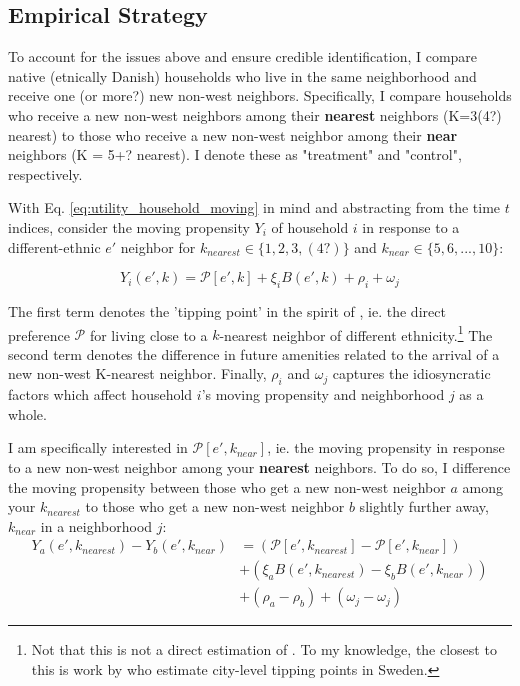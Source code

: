 \documentclass[../main.tex]{subfiles}
\begin{document}
\subsection{Empirical Strategy}
To account for the issues above and ensure credible identification, I compare native (etnically Danish) households who live in the same neighborhood and receive one (or more?) new non-west neighbors. Specifically, I compare households who receive a new non-west neighbors among their \textbf{nearest} neighbors (K=3(4?) nearest) to those who receive a new non-west neighbor among their \textbf{near} neighbors (K = 5+? nearest). I denote these as "treatment" and "control", respectively.

With Eq. \ref{eq:utility_household_moving} in mind and abstracting from the time $t$ indices, consider the moving propensity $Y_i$ of household $i$ in response to a different-ethnic $e'$ neighbor for $k_{nearest} \in \{1, 2, 3, (4?)\}$ and $k_{near} \in \{5, 6, ..., 10\}$:

\begin{equation}
    Y_i(e', k) = \mathcal{P}[e', k] + \xi_i B(e', k) + \rho_i + \omega_j
\end{equation}

The first term denotes the 'tipping point' in the spirit of \textcite{schelling1971dynamic}, ie. the direct preference $\mathcal{P}$ for living close to a $k$-nearest neighbor of different ethnicity.\footnote{Not that this is not a direct estimation of \textcite{schelling1971dynamic}. To my knowledge, the closest to this is work by \textcite{bohlmark_willen_2020_tipping} who estimate city-level tipping points in Sweden.}   The second term denotes the difference in future amenities related  to the arrival of a new non-west K-nearest neighbor. Finally, $\rho_i$ and $\omega_j$ captures the idiosyncratic factors which affect household $i$'s moving propensity and neighborhood $j$ as a whole. 

I am specifically interested in $\mathcal{P}[e', k_{near}]$, ie. the moving propensity in response to a new non-west neighbor among your \textbf{nearest} neighbors. To do so, I difference the moving propensity between those who get a new non-west neighbor $a$ among your $k_{nearest}$ to those who get a new non-west neighbor $b$ slightly further away, $k_{near}$ in a neighborhood $j$:
\begin{equation}
\begin{split}
    Y_a(e', k_{nearest}) - Y_b(e', k_{near}) &=( \mathcal{P}[e', k_{nearest}] - \mathcal{P}[e', k_{near}]) \\
    &+ (\xi_a B(e', k_{nearest}) - \xi_b B(e', k_{near})) \\
    &+ (\rho_a - \rho_b)  + (\omega_j - \omega_j)
\end{split}
\label{eq:move_propensity_diff}
\end{equation}
\end{document}
